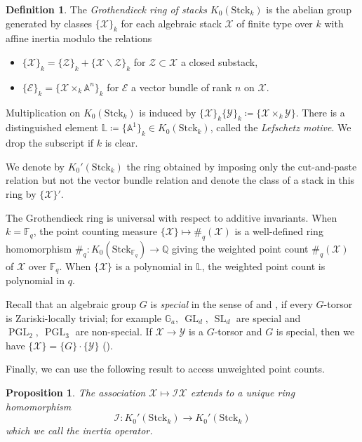 \documentclass[a4paper,12pt]{amsart}
\newtheorem{prop}[thm]{Proposition}
\theoremstyle{definition}
\newtheorem{defn}[thm]{Definition}
\newcommand{\bG}{\mathbb{G}}
\newcommand{\cX}{\mathcal{X}}
\newcommand{\cI}{\mathcal{I}}
\newcommand{\Ec}{\mathcal{E}}
\newcommand{\Zc}{\mathcal{Z}}
\newcommand{\Yc}{\mathcal{Y}}
\newcommand{\Q}{\mathbb{Q}}
\newcommand{\Ab}{\mathbb{A}}
\newcommand{\A}{\mathbb{A}}
\newcommand{\Fb}{\mathbb{F}}
\newcommand{\Lb}{\mathbb{L}}
\DeclareMathOperator{\PGL}{PGL}
\DeclareMathOperator{\GL}{GL}
\DeclareMathOperator{\SL}{SL}
\renewcommand{\setminus}{\smallsetminus}
\begin{document}
	\begin{defn}\label{defn:GrothringStck}
		\cite[\S 1]{Ekedahl}
		The \emph{Grothendieck ring of stacks} $K_0(\mathrm{Stck}_k)$ is the abelian group generated by classes $\{\cX\}_k$ for each algebraic stack $\cX$ of finite type over $k$ with affine inertia modulo the relations
		\begin{itemize}
			\item $\{\cX\}_k=\{\Zc\}_k+\{\cX \setminus \Zc\}_k$ for $\Zc \subset \cX$ a closed substack,
			\item $\{\Ec\}_k=\{\cX \times_k \Ab^n \}_k$ for $\Ec$ a vector bundle of rank $n$ on $\cX$.
		\end{itemize}
		Multiplication on $K_0(\mathrm{Stck}_k)$ is induced by $\{\cX\}_k\{\Yc\}_k\coloneqq\{\cX \times_k \Yc\}$. 
		There is a distinguished element $\Lb \coloneqq\{\A^1\}_k \in K_0(\mathrm{Stck}_k)$, called the \emph{Lefschetz motive}. We drop the subscript if $k$ is clear. 
	\end{defn}
	
	We denote by $K_0'(\mathrm{Stck}_k)$ the ring obtained by imposing only the cut-and-paste relation but not the vector bundle relation and denote the class of a stack in this ring by $\{\cX\}'$.  
	
	\medskip
	
	The Grothendieck ring is universal with respect to additive invariants. When $k=\Fb_q$, the point counting measure $\{\cX\} \mapsto \#_q(\cX)$ is a well-defined ring homomorphism $\#_q: K_0(\mathrm{Stck}_{\Fb_q}) \rightarrow \Q$ giving the weighted point count $\#_q(\cX)$ of $\cX$ over $\Fb_q$. When $\{\cX\}$ is a polynomial in $\Lb$, the weighted point count is polynomial in $q$.
	
	\medskip
	
	Recall that an algebraic group $G$ is \textit{special} in the sense of \cite{Serre} and \cite{Grothendieck}, if every $G$-torsor is Zariski-locally trivial; for example $\bG_a,~\GL_{d},~\SL_{d}$ are special and $\PGL_2,~\PGL_3$ are non-special. If $\mathcal X \rightarrow \mathcal Y$ is a $G$-torsor and $G$ is special, then we have $\{\mathcal X\} = \{G\} \cdot \{\mathcal Y\}$ (\cite[Prop. 1.1 iii)]{Ekedahl}). 
	
	
	
	\medskip
	
	Finally, we can use the following result to access unweighted point counts. 
	
	\begin{prop}{\cite[Prop. 5.3]{Fernex}}\label{prop:df} The association $\cX \mapsto \cI \cX$ extends to a unique ring homomorphism 
		$$
		\cI : K_0'(\mathrm{Stck}_k) \to K_0'(\mathrm{Stck}_k)
		$$
		which we call the inertia operator. 
	\end{prop}
	
\end{document}
